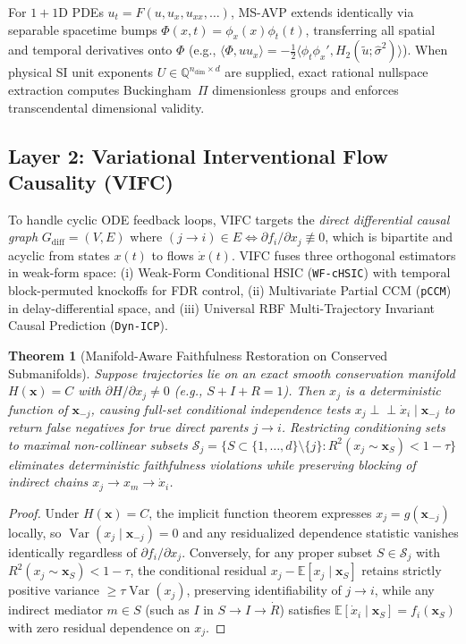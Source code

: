 \documentclass[11pt,a4paper]{article}
\newtheorem{theorem}{Theorem}
\begin{document}
For $1+1$D PDEs $u_t = F(u, u_x, u_{xx}, \dots)$, MS-AVP extends identically via separable spacetime bumps $\Phi(x,t)=\phi_x(x)\phi_t(t)$, transferring all spatial and temporal derivatives onto $\Phi$ (e.g., $\langle\Phi, u u_x\rangle = -\frac{1}{2}\langle \phi_t\phi_x', H_2(\tilde{u};\hat{\sigma}^2)\rangle$). When physical SI unit exponents $U \in \mathbb{Q}^{n_{\text{dim}}\times d}$ are supplied, exact rational nullspace extraction computes Buckingham~$\Pi$ dimensionless groups and enforces transcendental dimensional validity.

\subsection{Layer 2: Variational Interventional Flow Causality (VIFC)}
To handle cyclic ODE feedback loops, VIFC targets the \emph{direct differential causal graph} $G_{\text{diff}} = (V, E)$ where $(j \to i) \in E \iff \partial f_i / \partial x_j \not\equiv 0$, which is bipartite and acyclic from states $x(t)$ to flows $\dot{x}(t)$. VIFC fuses three orthogonal estimators in weak-form space: (i) Weak-Form Conditional HSIC (\texttt{WF-cHSIC}) with temporal block-permuted knockoffs for FDR control, (ii) Multivariate Partial CCM (\texttt{pCCM}) in delay-differential space, and (iii) Universal RBF Multi-Trajectory Invariant Causal Prediction (\texttt{Dyn-ICP}).

\begin{theorem}[Manifold-Aware Faithfulness Restoration on Conserved Submanifolds]
\label{thm:faithfulness}
Suppose trajectories lie on an exact smooth conservation manifold $H(\mathbf{x}) = C$ with $\partial H/\partial x_j \neq 0$ (e.g., $S+I+R=1$). Then $x_j$ is a deterministic function of $\mathbf{x}_{-j}$, causing full-set conditional independence tests $x_j \perp\!\!\!\perp \dot{x}_i \mid \mathbf{x}_{-j}$ to return false negatives for true direct parents $j \to i$. Restricting conditioning sets to maximal non-collinear subsets $\mathcal{S}_j = \{ S \subset \{1,\dots,d\}\setminus\{j\} : R^2(x_j \sim \mathbf{x}_S) < 1 - \tau \}$ eliminates deterministic faithfulness violations while preserving blocking of indirect chains $x_j \to x_m \to \dot{x}_i$.
\end{theorem}
\begin{proof}
Under $H(\mathbf{x})=C$, the implicit function theorem expresses $x_j = g(\mathbf{x}_{-j})$ locally, so $\operatorname{Var}(x_j \mid \mathbf{x}_{-j}) = 0$ and any residualized dependence statistic vanishes identically regardless of $\partial f_i/\partial x_j$. Conversely, for any proper subset $S \in \mathcal{S}_j$ with $R^2(x_j \sim \mathbf{x}_S) < 1-\tau$, the conditional residual $x_j - \mathbb{E}[x_j \mid \mathbf{x}_S]$ retains strictly positive variance $\ge \tau \operatorname{Var}(x_j)$, preserving identifiability of $j \to i$, while any indirect mediator $m \in S$ (such as $I$ in $S \to I \to \dot{R}$) satisfies $\mathbb{E}[\dot{x}_i \mid \mathbf{x}_S] = f_i(\mathbf{x}_S)$ with zero residual dependence on $x_j$.
\end{proof}
\end{document}
